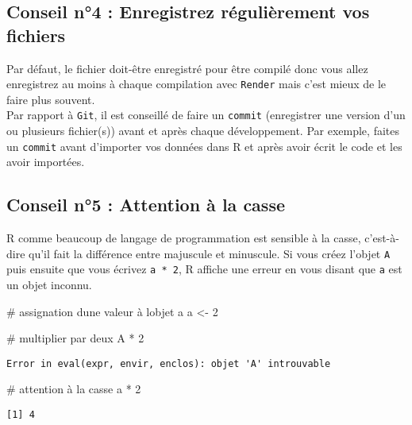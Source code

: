 \documentclass[
  letterpaper,
  DIV=11,
  numbers=noendperiod]{scrartcl}
\newenvironment{Shaded}{\begin{snugshade}}{\end{snugshade}}
\newcommand{\CommentTok}[1]{\textcolor[rgb]{0.37,0.37,0.37}{#1}}
\newcommand{\DecValTok}[1]{\textcolor[rgb]{0.68,0.00,0.00}{#1}}
\newcommand{\NormalTok}[1]{\textcolor[rgb]{0.00,0.23,0.31}{#1}}
\newcommand{\OtherTok}[1]{\textcolor[rgb]{0.00,0.23,0.31}{#1}}
\newcommand{\SpecialCharTok}[1]{\textcolor[rgb]{0.37,0.37,0.37}{#1}}
\begin{document}
\hypertarget{conseil-n4-enregistrez-ruxe9guliuxe8rement-vos-fichiers}{%
\subsection{\texorpdfstring{\textbf{Conseil n°4} : Enregistrez
régulièrement vos
fichiers}{Conseil n°4 : Enregistrez régulièrement vos fichiers}}\label{conseil-n4-enregistrez-ruxe9guliuxe8rement-vos-fichiers}}

Par défaut, le fichier doit-être enregistré pour être compilé donc vous
allez enregistrez au moins à chaque compilation avec \texttt{Render}
mais c'est mieux de le faire plus souvent.\\
Par rapport à \texttt{Git}, il est conseillé de faire un \texttt{commit}
(enregistrer une version d'un ou plusieurs fichier(s)) avant et après
chaque développement. Par exemple, faites un \texttt{commit} avant
d'importer vos données dans R et après avoir écrit le code et les avoir
importées.

\hypertarget{conseil-n5-attention-uxe0-la-casse}{%
\subsection{\texorpdfstring{\textbf{Conseil n°5} : Attention à la
casse}{Conseil n°5 : Attention à la casse}}\label{conseil-n5-attention-uxe0-la-casse}}

R comme beaucoup de langage de programmation est sensible à la casse,
c'est-à-dire qu'il fait la différence entre majuscule et minuscule. Si
vous créez l'objet \texttt{A} puis ensuite que vous écrivez
\texttt{a\ *\ 2}, R affiche une erreur en vous disant que \texttt{a} est
un objet inconnu.

\begin{Shaded}
\begin{Highlighting}[]
\CommentTok{\# assignation d\textquotesingle{}une valeur à l\textquotesingle{}objet a}
\NormalTok{a }\OtherTok{\textless{}{-}} \DecValTok{2}

\CommentTok{\# multiplier par deux}
\NormalTok{A }\SpecialCharTok{*} \DecValTok{2}
\end{Highlighting}
\end{Shaded}

\begin{verbatim}
Error in eval(expr, envir, enclos): objet 'A' introuvable
\end{verbatim}

\begin{Shaded}
\begin{Highlighting}[]
\CommentTok{\# attention à la casse}
\NormalTok{a }\SpecialCharTok{*} \DecValTok{2}
\end{Highlighting}
\end{Shaded}

\begin{verbatim}
[1] 4
\end{verbatim}
\end{document}
